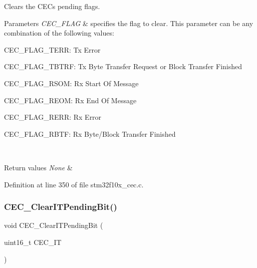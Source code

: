 Clears the C\+EC\textquotesingle{}s pending flags. 


\begin{DoxyParams}{Parameters}
{\em C\+E\+C\+\_\+\+F\+L\+AG} & specifies the flag to clear. This parameter can be any combination of the following values\+: \begin{DoxyItemize}
\item C\+E\+C\+\_\+\+F\+L\+A\+G\+\_\+\+T\+E\+RR\+: Tx Error \item C\+E\+C\+\_\+\+F\+L\+A\+G\+\_\+\+T\+B\+T\+RF\+: Tx Byte Transfer Request or Block Transfer Finished \item C\+E\+C\+\_\+\+F\+L\+A\+G\+\_\+\+R\+S\+OM\+: Rx Start Of Message \item C\+E\+C\+\_\+\+F\+L\+A\+G\+\_\+\+R\+E\+OM\+: Rx End Of Message \item C\+E\+C\+\_\+\+F\+L\+A\+G\+\_\+\+R\+E\+RR\+: Rx Error \item C\+E\+C\+\_\+\+F\+L\+A\+G\+\_\+\+R\+B\+TF\+: Rx Byte/\+Block Transfer Finished \end{DoxyItemize}
\\
\hline
\end{DoxyParams}

\begin{DoxyRetVals}{Return values}
{\em None} & \\
\hline
\end{DoxyRetVals}


Definition at line 350 of file stm32f10x\+\_\+cec.\+c.

\mbox{\label{group___c_e_c___exported___functions_gade646921262a077172c708953822f248}} 
\subsubsection{\texorpdfstring{C\+E\+C\+\_\+\+Clear\+I\+T\+Pending\+Bit()}{CEC\_ClearITPendingBit()}}
{\footnotesize\ttfamily void C\+E\+C\+\_\+\+Clear\+I\+T\+Pending\+Bit (\begin{DoxyParamCaption}\item[{uint16\+\_\+t}]{C\+E\+C\+\_\+\+IT }\end{DoxyParamCaption})}



